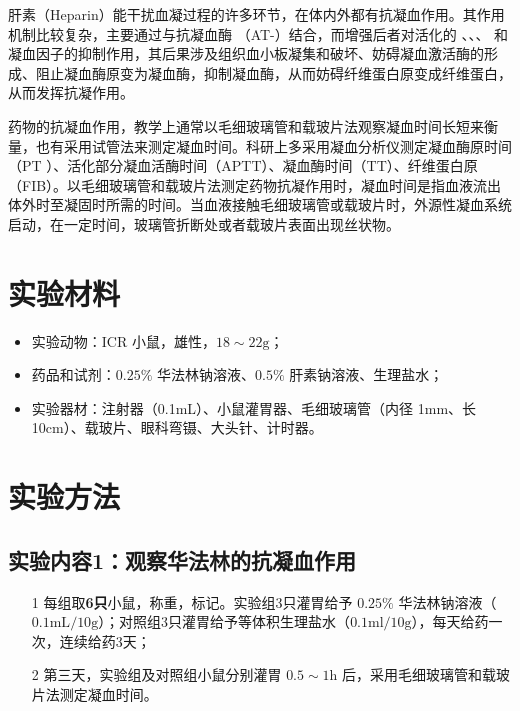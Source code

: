 \documentclass[UTF8]{ctexart}
\begin{document}
肝素（Heparin）能干扰血凝过程的许多环节，在体内外都有抗凝血作用。其作用机制比较复杂，主要通过与抗凝血酶 \uppercase\expandafter{}（AT-\uppercase\expandafter{}）结合，而增强后者对活化的 \uppercase\expandafter{}、\uppercase\expandafter{}、\uppercase\expandafter{}、\uppercase\expandafter{} 和 \uppercase\expandafter{} 凝血因子的抑制作用，其后果涉及组织血小板凝集和破坏、妨碍凝血激活酶的形成、阻止凝血酶原变为凝血酶，抑制凝血酶，从而妨碍纤维蛋白原变成纤维蛋白，从而发挥抗凝作用。

药物的抗凝血作用，教学上通常以毛细玻璃管和载玻片法观察凝血时间长短来衡量，也有采用试管法来测定凝血时间。科研上多采用凝血分析仪测定凝血酶原时间（PT
）、活化部分凝血活酶时间（APTT）、凝血酶时间（TT）、纤维蛋白原（FIB）。以毛细玻璃管和载玻片法测定药物抗凝作用时，凝血时间是指血液流出体外时至凝固时所需的时间。当血液接触毛细玻璃管或载玻片时，外源性凝血系统启动，在一定时间，玻璃管折断处或者载玻片表面出现丝状物。

\section{实验材料}

\begin{itemize}
    \item 实验动物：ICR 小鼠，雄性，$18\sim 22\text{g}$；
    \item 药品和试剂：$0.25\%$ 华法林钠溶液、$0.5\%$ 肝素钠溶液、生理盐水；
    \item 实验器材：注射器（0.1mL）、小鼠灌胃器、毛细玻璃管（内径 1mm、长 10cm）、载玻片、眼科弯镊、大头针、计时器。
\end{itemize}

\section{实验方法}

\subsection{实验内容1：观察华法林的抗凝血作用}

\begin{itemize}
    \item [1] 每组取\textbf{6只}小鼠，称重，标记。实验组3只灌胃给予 $0.25\%$ 华法林钠溶液（$0.1\text{mL}/10\text{g}$）；对照组3只灌胃给予等体积生理盐水（$0.1\text{ml}/10\text{g}$），每天给药一次，连续给药3天；
    \item [2] 第三天，实验组及对照组小鼠分别灌胃 $0.5\sim 1\text{h}$ 后，采用毛细玻璃管和载玻片法测定凝血时间。
\end{itemize}
\end{document}
